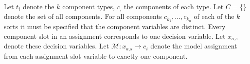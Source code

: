 Let $t_i$ denote the $k$ component types, $c_{\text{,}}$ the components of each type. Let $C = \{\}$ denote the set of all components.
For all components $c_{k_1}, ..., c_{k_n}$ of each of the $k$ sorts it must be specified that the component variables are distinct. 
Every component slot in an assignment corresponds to one decision variable. Let $x_{a\text{,}s}$ denote these decision variables. 
Let $\mathcal{M}: x_{a\text{,}s} \rightarrow c_i$ denote the model assignment from each assignment slot variable to exactly one component.